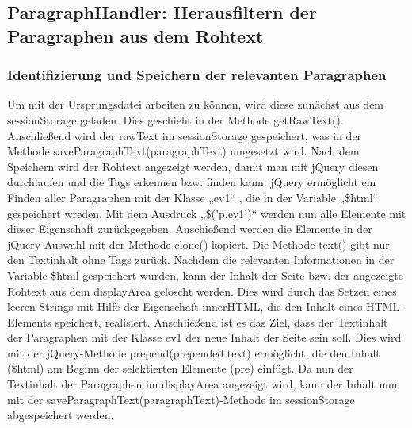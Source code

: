 {\subsection{ParagraphHandler: Herausfiltern der Paragraphen aus dem Rohtext}

\subsubsection{Identifizierung und Speichern der relevanten Paragraphen}
Um mit der Ursprungsdatei arbeiten zu können, wird diese zunächst aus dem sessionStorage geladen. Dies geschieht in der Methode getRawText(). Anschließend wird der rawText im sessionStorage gespeichert, was in der Methode saveParagraphText(paragraphText) umgesetzt wird. Nach dem Speichern wird der Rohtext angezeigt werden, damit man mit jQuery diesen durchlaufen und die Tags erkennen bzw. finden kann. jQuery ermöglicht ein Finden aller Paragraphen mit der Klasse „ev1“ , die in der Variable „\$html“ gespeichert wreden. Mit dem Ausdruck „\$('p.ev1')“ werden nun alle Elemente mit dieser Eigenschaft zurückgegeben. Anschießend werden die Elemente in der jQuery-Auswahl mit der Methode clone() kopiert. Die Methode text() gibt nur den Textinhalt ohne Tags zurück. Nachdem die relevanten Informationen in der Variable \$html gespeichert wurden, kann der Inhalt der Seite bzw. der angezeigte Rohtext aus dem displayArea gelöscht werden. Dies wird durch das Setzen eines leeren Strings mit Hilfe der Eigenschaft innerHTML, die den Inhalt eines HTML-Elements speichert, realisiert. Anschließend ist es das Ziel, dass der Textinhalt der Paragraphen mit der Klasse ev1 der neue Inhalt der Seite sein soll. Dies wird mit der jQuery-Methode prepend(prepended text) ermöglicht, die den Inhalt (\$html) am Beginn der selektierten Elemente (pre) einfügt. Da nun der Textinhalt der Paragraphen im displayArea angezeigt wird, kann der Inhalt nun mit der saveParagraphText(paragraphText)-Methode im sessionStorage abgespeichert werden.

}
